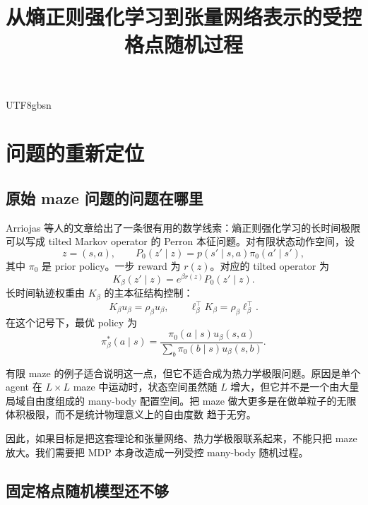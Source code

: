 \documentclass[11pt]{article}
\title{从熵正则强化学习到张量网络表示的受控格点随机过程}
\author{}
\date{}
\begin{document}
\begin{CJK*}{UTF8}{gbsn}
\maketitle
\tableofcontents

\section{问题的重新定位}

\subsection{原始 maze 问题的问题在哪里}

Arriojas 等人的文章给出了一条很有用的数学线索：熵正则强化学习的长时间极限可以写成
tilted Markov operator 的 Perron 本征问题。对有限状态动作空间，设
\begin{equation}
    z=(s,a),
    \qquad
    P_0(z'\mid z)=p(s'\mid s,a)\pi_0(a'\mid s'),
\end{equation}
其中 \(\pi_0\) 是 prior policy。一步 reward 为 \(r(z)\)。对应的 tilted operator 为
\begin{equation}
    K_\beta(z'\mid z)=e^{\beta r(z)}P_0(z'\mid z).
    \label{eq:tilted-finite}
\end{equation}
长时间轨迹权重由 \(K_\beta\) 的主本征结构控制：
\begin{equation}
    K_\beta u_\beta=\rho_\beta u_\beta,
    \qquad
    \ell_\beta^\top K_\beta=\rho_\beta \ell_\beta^\top.
    \label{eq:finite-pf}
\end{equation}
在这个记号下，最优 policy 为
\begin{equation}
    \pi_\beta^*(a\mid s)
    =
    \frac{\pi_0(a\mid s)u_\beta(s,a)}
    {\sum_{b}\pi_0(b\mid s)u_\beta(s,b)}.
    \label{eq:optimal-policy-finite}
\end{equation}

有限 maze 的例子适合说明这一点，但它不适合成为热力学极限问题。原因是单个 agent 在
\(L\times L\) maze 中运动时，状态空间虽然随 \(L\) 增大，但它并不是一个由大量局域自由度组成的
many-body 配置空间。把 maze 做大更多是在做单粒子的无限体积极限，而不是统计物理意义上的自由度数
趋于无穷。

因此，如果目标是把这套理论和张量网络、热力学极限联系起来，不能只把 maze 放大。我们需要把
MDP 本身改造成一列受控 many-body 随机过程。

\subsection{固定格点随机模型还不够}


\end{CJK*}
\end{document}

